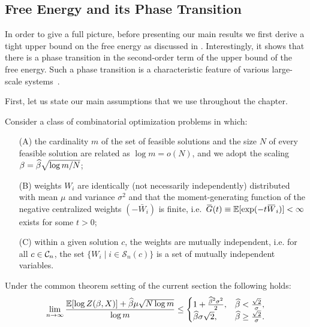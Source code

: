 \subsection{Free Energy and its Phase
  Transition}
\label{sec:free_main_results_statements}

In order to give a full picture, before presenting our main results we 
first derive a tight upper bound on the free energy as discussed
in \citep{aofa2014}.  Interestingly, it shows
that there is a phase transition in the second-order term of the upper bound of
the free energy. Such a phase transition is a characteristic feature of various
large-scale systems~\citep[see][]{LUCZAK1994, talagrand03,
MM:AM:IPC2009}.

First, let us state our main assumptions that we use throughout the chapter.

\begin{definition}
\label{def:cts}
Consider a class of combinatorial optimization problems in which:
\begin{itemize}
\item[{\rm (A)}] the cardinality
$m$ of the set of feasible solutions and the size $N$ of every feasible
solution are related as $\log m=o(N)$, and we adopt the scaling
$\beta=\widehat{\beta} \sqrt{ \log m / N}$; 
%
\item[{\rm (B)}]
weights $W_i$ are identically (not necessarily independently) distributed with
mean $\mu$ and variance $\sigma^2$ and that the moment-generating function
 of the negative centralized weights
$(-\bar{W}_i)$ is finite, i.e.~$\mspace{2mu}\overline{\mspace{-2mu}G\mspace{-2mu}}\mspace{2mu}(t) \equiv
\mathbb{E}[\exp(-t\mspace{2mu}\overline{\mspace{-2mu}W\mspace{-2mu}}\mspace{2mu}_i)]<\infty$ exists for some $t>0$;
%
%
\item[{\rm (C)}] 
within a given solution $c$, the weights are mutually independent, i.e. for all
$c\in {\cal C}_n$, the set $\{W_i \mid i\in\mathcal{S}_n(c)\}$ is a set of mutually
independent variables.
\end{itemize}
\end{definition}

\begin{theorem}
\label{thm:general-upper-bound}
Under the common theorem setting of the current section the following holds:
\begin{equation}
  \lim_{n\to \infty} \frac{{\mathbb{E}}[\log Z(\beta, X)] +\widehat \beta \mu \sqrt{N\log m}}{\log m}
  \leq
  \begin{cases}
    1+\frac{\widehat{\beta}^2\sigma^2}{2}, &\widehat{\beta}< \frac{\sqrt{2}}{\sigma},\\
    \widehat{\beta} \sigma \sqrt{2}, &\widehat{\beta}\ge \frac{\sqrt{2}}{ \sigma}.
  \end{cases}
\end{equation}
\end{theorem}

